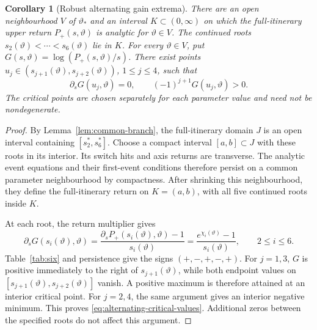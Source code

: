 \documentclass[11pt]{article}
\newtheorem{corollary}[theorem]{Corollary}
\theoremstyle{remark}
\begin{document}
\begin{corollary}[Robust alternating gain extrema]
\label{cor:gain-oscillation}
There are an open neighbourhood \(V\) of \(\vartheta_*\) and an interval
\(K\subset(0,\infty)\) on which the full-itinerary upper return
\(P_+(s,\vartheta)\) is analytic for \(\vartheta\in V\).  The continued
roots \(s_2(\vartheta)<\cdots<s_6(\vartheta)\) lie in \(K\).
For every \(\vartheta\in V\), put
\(G(s,\vartheta)=\log(P_+(s,\vartheta)/s)\).  There exist points
\(u_j\in(s_{j+1}(\vartheta),s_{j+2}(\vartheta))\), \(1\le j\le4\),
such that
\begin{equation}\label{eq:alternating-critical-values}
 \partial_sG(u_j,\vartheta)=0,\qquad
                  (-1)^{j+1}G(u_j,\vartheta)>0.
\end{equation}
The critical points are chosen separately for each parameter value and
need not be nondegenerate.
\end{corollary}
\begin{proof}
By Lemma~\ref{lem:common-branch}, the full-itinerary domain \(J\) is
an open interval containing \([s_2^*,s_6^*]\).
Choose a compact interval \([a,b]\subset J\) with
these roots in its interior.  Its switch hits and axis returns are
transverse.  The analytic event equations and their first-event
conditions therefore persist on a common parameter neighbourhood by
compactness.  After shrinking this neighbourhood, they define the
full-itinerary return on \(K=(a,b)\), with all five continued roots
inside \(K\).

At each root, the return multiplier gives
\begin{equation}\label{eq:gain-root-derivative}
 \partial_sG(s_i(\vartheta),\vartheta)
 =\frac{\partial_sP_+(s_i(\vartheta),\vartheta)-1}{s_i(\vartheta)}
 =\frac{e^{\chi_i(\vartheta)}-1}{s_i(\vartheta)},\qquad 2\le i\le6.
\end{equation}
Table~\ref{tab:six} and persistence give the signs \((+,-,+,-,+)\).
For \(j=1,3\), \(G\) is positive immediately to the right of
\(s_{j+1}(\vartheta)\), while both endpoint values on
\([s_{j+1}(\vartheta),s_{j+2}(\vartheta)]\) vanish.  A positive
maximum is therefore attained at an interior critical point.
For \(j=2,4\), the same argument gives an interior negative minimum.
This proves \eqref{eq:alternating-critical-values}.  Additional zeros
between the specified roots do not affect this argument.
\end{proof}
\end{document}
